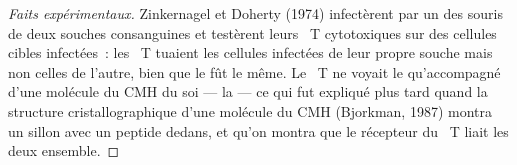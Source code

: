 \begin{proof}[Faits expérimentaux]
Zinkernagel et Doherty (1974) infectèrent par un  des souris de
deux souches consanguines et testèrent leurs ~T cytotoxiques
sur des cellules cibles infectées~: les ~T tuaient les
cellules infectées de leur propre souche mais non celles de l'autre,
bien que le  fût le même. Le ~T ne voyait le 
qu'accompagné d'une molécule du CMH du soi --- la \emph{} --- ce qui fut expliqué plus tard quand la structure
cristallographique d'une molécule du CMH (Bjorkman, 1987) montra un
sillon avec un peptide dedans, et qu'on montra que le récepteur du
~T liait les deux ensemble.
\end{proof}

